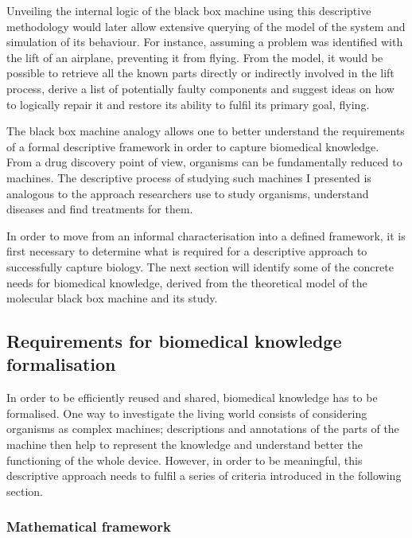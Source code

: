 Unveiling the internal logic of the black box machine using this descriptive methodology would later allow extensive querying of the model of the system and simulation of its behaviour. For instance, assuming a problem was identified with the lift of an airplane, preventing it from flying. From the model, it would be possible to retrieve all the known parts directly or indirectly involved in the lift process, derive a list of potentially faulty components and suggest ideas on how to logically repair it and restore its ability to fulfil its primary goal, flying.

The black box machine analogy allows one to better understand the requirements of a formal descriptive framework in order to capture biomedical knowledge. From a drug discovery point of view, organisms can be fundamentally reduced to machines. The descriptive process of studying such machines I presented is analogous to the approach researchers use to study organisms, understand diseases and find treatments for them.

In order to move from an informal characterisation into a defined framework, it is first necessary to determine what is required for a descriptive approach to successfully capture biology. The next section will identify some of the concrete needs for biomedical knowledge, derived from the theoretical model of the molecular black box machine and its study.

\subsection{Requirements for biomedical knowledge formalisation}

In order to be efficiently reused and shared, biomedical knowledge has to be formalised. One way to investigate the living world consists of considering organisms as complex machines; descriptions and annotations of the parts of the machine then help to represent the knowledge and understand better the functioning of the whole device. However, in order to be meaningful, this descriptive approach needs to fulfil a series of criteria introduced in the following section.

\subsubsection{Mathematical framework}
\label{reqmath}

